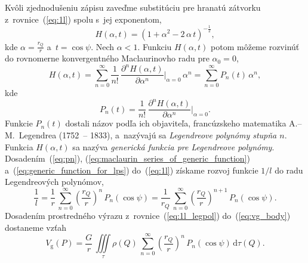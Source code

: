 \documentclass[a4paper,12pt]{book}
\newcommand{\diff}{\mathrm d}
\newcommand{\gidx}{\mathrm g}
\begin{document}
Kvôli zjednodušeniu zápisu zaveďme substitúciu pre hranatú zátvorku
z~rovnice~(\ref{eq:1l}) spolu s~jej exponentom,
%
\begin{equation}
\label{eq:generic_function_for_lps}
H(\alpha, t) = \left(1 + \alpha^2 - 2 \, \alpha\, t \right)^{-\frac{1}{2}}{,}
\end{equation}
%
kde $\alpha = \frac{r_Q}{r}$ a~$t = \cos\psi$.  Nech $\alpha < 1$.  Funkciu
$H(\alpha, t)$ potom môžeme rozvinúť do rovnomerne konvergentného Maclaurinovho
radu pre $\alpha_0 = 0$,
%
\begin{equation}
\label{eq:maclaurin_series_of_generic_function}
H(\alpha, t) = \sum_{n = 0}^\infty \frac{1}{n!} \, \frac{\partial^n H(\alpha,
t)}{\partial \alpha^n} \bigg\lvert_{\alpha = 0} \, \alpha^n = \sum_{n 
= 0}^\infty P_n(t) \, \alpha^n{,}
\end{equation}
%
kde
%
\begin{equation}
\label{eq:pn}
P_n(t) = \frac{1}{n!} \, \frac{\partial^n H(\alpha, t)}{\partial \alpha^n} 
\bigg\lvert_{\alpha = 0}{.}
\end{equation}
%
Funkcie $P_n(t)$ dostali názov podľa ich objaviteľa, francúzskeho matematika
A.--M.~Legendrea (1752~-- 1833), a~nazývajú sa \emph{Legendreove polynómy
stupňa $n$}.  Funkcia $H(\alpha, t)$ sa nazýva \emph{generická funkcia pre
Legendreove polynómy}.  Dosadením~(\ref{eq:pn}),
(\ref{eq:maclaurin_series_of_generic_function}) 
a~(\ref{eq:generic_function_for_lps}) do~(\ref{eq:1l}) získame rozvoj funkcie 
$1 \slash l$ do radu Legendreových polynómov,
%
\begin{equation}
\label{eq:1l_legpol}
\frac{1}{l} = \frac{1}{r} \, \sum_{n = 0}^\infty \left( \frac{r_Q}{r} 
\right)^{n} \, P_n(\cos\psi) = \frac{1}{r_Q} \, \sum_{n = 0}^\infty \left( 
\frac{r_Q}{r} \right)^{n + 1} \, P_n(\cos\psi){.}
\end{equation}
%
Dosadením prostredného výrazu z~rovnice~(\ref{eq:1l_legpol}) 
do~(\ref{eq:vg_body})
dostaneme vzťah
%
\begin{equation}
\label{eq:vg_legpol}
V_\gidx(P) = \frac{G}{r} \, \iiint\limits_{\tau} \rho(Q) \, \sum_{n 
= 0}^{\infty} \left( \frac{r_Q}{r} \right)^n \, P_n(\cos\psi) \, 
\diff\tau(Q){.}
\end{equation}
\end{document}
